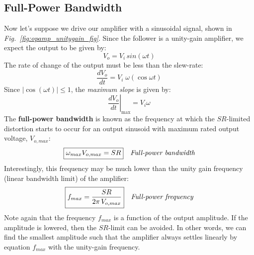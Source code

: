 \subsection{Full-Power Bandwidth}
Now let's suppose we drive our amplifier with a sinusoidal signal, shown in \emph{Fig.~\ref{fig:opamp_unitygain_fig}}.  Since the follower is a  unity-gain amplifier, we expect the output to be given by:
    \begin{equation} 
        V_o = V_i \,sin(\omega t) 
    \end{equation}
The rate of change of the output must be less than the slew-rate:
    \begin{equation}
        \frac{dV_o}{dt} = V_i\;\omega(\cos\omega t)
    \end{equation}
Since $|\cos(\omega t)| \le 1$, the \textit{maximum slope} is given by:
    \begin{equation}
        \left. \frac{dV_o}{dt} \right|_{\text{max}} = V_i \omega 
    \end{equation}
The \textbf{full-power bandwidth} is known as the frequency at which the $SR$-limited distortion starts to occur for an output sinusoid with maximum rated output voltage, $V_{o,max}$:
    \begin{align}
        \Aboxed{\omega_{max} V_{o,max} &= SR}
        &\textit{Full-power bandwidth}
        \label{eq:full_power_bw}
    \end{align} 
Interestingly, this frequency may be much lower than the unity gain frequency (linear bandwidth limit) of the amplifier:
    \begin{align} 
        \Aboxed{f_{max} = \frac{SR}{2\pi\,V_{o,max}}}
        &\textit{Full-power frequency}
        \label{eq:full_power_freq}
    \end{align}
Note again that the frequency $f_{max}$ is a function of the output amplitude.  If the amplitude is lowered, then the $SR$-limit can be avoided.  In other words, we can find the smallest amplitude such that the amplifier always settles linearly by equation $f_{max}$ with the unity-gain frequency.
